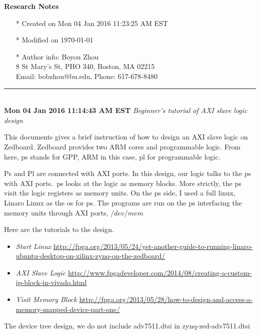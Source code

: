\documentclass[]{article}
\begin{document}
\pagestyle{empty}
{\large\textbf{Research Notes}}
\begin{itemize}
    \item[*] Created on Mon 04 Jan 2016 11:23:25 AM EST
    \item[*] Modified on \today
    \item[*] Author info: Boyou Zhou\\
             8 St Mary's St, PHO 340, Boston, MA 02215\\
             Email: bobzhou@bu.edu, Phone: 617-678-8480\\
\end{itemize}

\rule[-0.1cm]{7.5in}{0.01cm}\\
\noindent \textbf{Mon 04 Jan 2016 11:14:43 AM EST}
\textit{Beginner's tutorial of AXI slave logic design}

This documents gives a brief instruction of how to design an AXI slave logic on Zedboard.
 Zedboard provides two ARM cores and programmable logic.
 From here, ps stands for GPP, ARM in this case, pl for programmable logic.\ 

Ps and Pl are connected with AXI ports. In this design, our logic talks to the
ps with AXI ports.\ ps looks at the logic as memory blocks. More strictly, the
ps visit the logic registers as memory units. On the ps side, I used a full
linux, Linaro Linux as the os for ps. The programs are run on the ps interfacing
the memory units through AXI ports, $/dev/mem$

Here are the tutorials to the design.
\indent		\begin{itemize}
			\item \textit{Start Linux}
			\url{http://fpga.org/2013/05/24/yet-another-guide-to-running-linaro-ubuntu-desktop-on-xilinx-zynq-on-the-zedboard/}
			\item \textit{AXI Slave Logic}
			\url{http://www.fpgadeveloper.com/2014/08/creating-a-custom-ip-block-in-vivado.html}
			\item \textit{Visit Memory Block}
			\url{http://fpga.org/2013/05/28/how-to-design-and-access-a-memory-mapped-device-part-one/}
        \end{itemize}

The device tree design, we do not include adv7511.dtsi in zynq-zed-adv7511.dtsi
\end{document}
